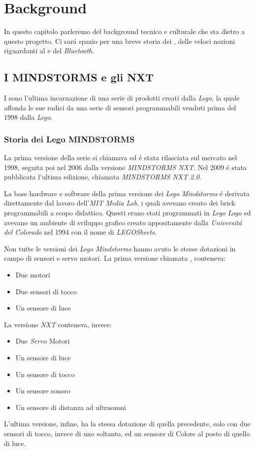 \chapter{Background}
\label{chap:BG}

In questo capitolo parleremo del background tecnico e culturale che sta
dietro a questo progetto. Ci sar\'a spazio per una breve storia dei \nxt{}, 
delle veloci nozioni riguardanti al \PID{} e del \emph{Bluetooth}.

\section{I MINDSTORMS e gli NXT}
I \nxt{} sono l'ultima incarnazione di una serie di prodotti creati
dalla \emph{Lego}, la quale affonda le sue radici da una serie di sensori
programmabili venduti prima del 1998 dalla \emph{Lego}.

\subsection{Storia dei Lego MINDSTORMS}
La prima versione
della serie si chiamava \RIS{} ed \'e stata rilasciata sul mercato nel
1998, seguita poi nel 2006 dalla versione \emph{MINDSTORMS NXT}. Nel 2009
\'e stata pubblicata l'ultima edizione, chiamata \emph{MINDSTORMS NXT 2.0}.

La base hardware e software della prima versione dei \emph{Lego Mindstorms}
\'e derivata direttamente dal lavoro dell'\emph{MIT Media Lab}, i quali
avevano creato dei brick programmabili a scopo didattico. Questi erano stati 
programmati in \emph{Lego Logo} ed avevano un ambiente di sviluppo grafico
creato appositamente dalla \emph{Universit\'a del Colorado} nel 1994 con il
nome di \emph{LEGOSheets}.

Non tutte le versioni dei \emph{Lego Mindstorms} hanno avuto le stesse
dotazioni in campo di sensori e servo motori. La prima versione chiamata
\RIS{}, conteneva:
\begin{itemize}
    \item Due motori
    \item Due sensori di tocco
    \item Un sensore di luce
\end{itemize}    
La versione \emph{NXT} conteneva, invece:
\begin{itemize}
    \item Due \emph{Servo} Motori
    \item Un sensore di luce
    \item Un sensore di tocco
    \item Un sensore sonoro
    \item Un sensore di distanza ad ultrasuoni
\end{itemize}
L'ultima versione, infine, ha la stessa dotazione di quella precedente,
solo con due sensori di tocco, invece di uno soltanto, ed un sensore di
Colore al posto di quello di luce. 

